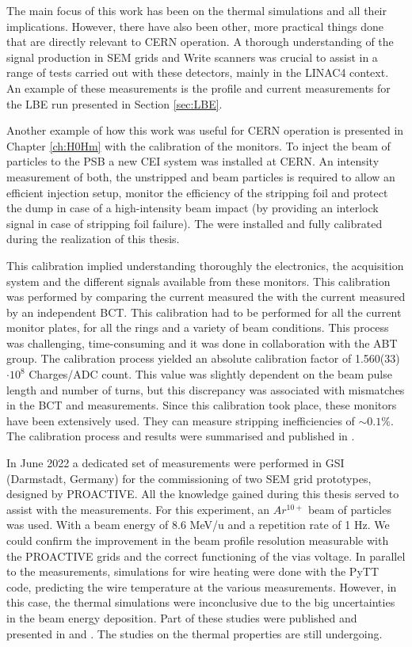 The main focus of this work has been on the thermal simulations and all their implications. However, there have also been other, more practical things done that are directly relevant to CERN operation. A thorough understanding of the signal production in SEM grids and Write scanners was crucial to assist in a range of tests carried out with these detectors, mainly in the LINAC4 context. An example of these measurements is the profile and current measurements for the LBE run presented in Section \ref{sec:LBE}. 

Another example of how this work was useful for CERN operation is presented in Chapter \ref{ch:H0Hm} with the calibration of the \hzhm monitors. To inject the \hm beam of particles to the PSB a new CEI system was installed at CERN. An intensity measurement of both, the unstripped \hzz and \hm beam particles is required to allow an efficient injection setup, monitor the efficiency of the stripping foil and protect the dump in case of a high-intensity beam impact (by providing an interlock signal in case of stripping foil failure). The \hzhm were installed and fully calibrated during the realization of this thesis. 

This calibration implied understanding thoroughly the electronics, the acquisition system and the different signals available from these monitors. This calibration was performed by comparing the current measured the \hzhm with the current measured by an independent BCT. This calibration had to be performed for all the current monitor plates, for all the rings and a variety of beam conditions.  This process was challenging, time-consuming and it was done in collaboration with the ABT group. The calibration process yielded an absolute calibration factor of 1.560(33)$\cdot 10^8$ Charges/ADC count. This value was slightly dependent on the beam pulse length and number of turns, but this discrepancy was associated with mismatches in the BCT and \hzhm measurements. Since this calibration took place, these monitors have been extensively used. They can measure stripping inefficiencies of $\sim 0.1 \%$. The calibration process and results were summarised and published in \parencite[][]{ref:Ibic2021Araceli}.

In June 2022 a dedicated set of measurements were performed in GSI (Darmstadt, Germany) for the commissioning of two SEM grid prototypes, designed by PROACTIVE. All the knowledge gained during this thesis served to assist with the measurements. For this experiment, an $Ar^{10+}$ beam of particles was used. With a beam energy of 8.6 MeV/u and a repetition rate of 1 Hz. We could confirm the improvement in the beam profile resolution measurable with the PROACTIVE grids and the correct functioning of the vias voltage. In parallel to the measurements, simulations for wire heating were done with the PyTT code, predicting the wire temperature at the various measurements. However, in this case, the thermal simulations were inconclusive due to the big uncertainties in the beam energy deposition. Part of these studies were published and presented in \parencite[][]{ref:Linac2022Thomas} and \parencite[][]{ref:Ibic2022Juan}. The studies on the thermal properties are still undergoing.

